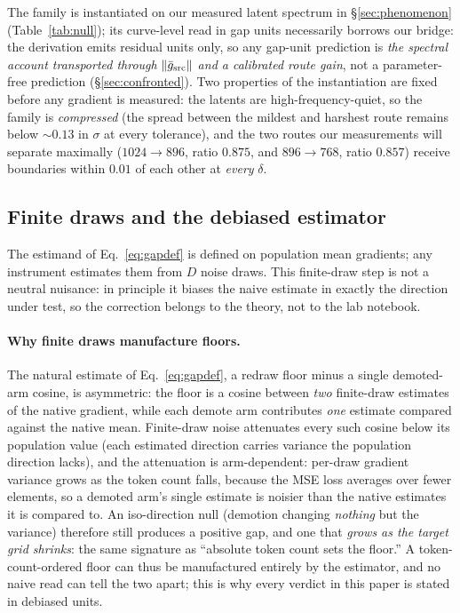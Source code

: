 The family is instantiated on our measured latent spectrum in
\S\ref{sec:phenomenon} (Table~\ref{tab:null}); its curve-level read in
gap units necessarily borrows our bridge: the derivation emits residual
units only, so any gap-unit prediction is \emph{the spectral account
transported through} $\|\bar g_{\mathrm{src}}\|$ \emph{and a calibrated route gain}, not a
parameter-free prediction (\S\ref{sec:confronted}). Two properties of
the instantiation are fixed before any gradient is measured: the latents
are high-frequency-quiet, so the family is \emph{compressed} (the
spread between the mildest and harshest route remains below ${\sim}0.13$
in $\sigma$ at every tolerance), and the two routes our measurements
will separate maximally ($1024{\to}896$, ratio $0.875$, and
$896{\to}768$, ratio $0.857$) receive boundaries within $0.01$ of each
other at \emph{every} $\delta$.

\subsection{Finite draws and the debiased estimator}
\label{sec:debias}

The estimand of Eq.~\ref{eq:gapdef} is defined on population mean
gradients; any instrument estimates them from $D$ noise draws. This
finite-draw step is not a neutral nuisance: in principle it biases the
naive estimate in exactly the direction under test, so the correction
belongs to the theory, not to the lab notebook.

\paragraph{Why finite draws manufacture floors.}
The natural estimate of Eq.~\ref{eq:gapdef}, a redraw floor minus a
single demoted-arm cosine, is asymmetric: the floor is a cosine
between \emph{two} finite-draw estimates of the native gradient, while
each demote arm contributes \emph{one} estimate compared against the
native mean. Finite-draw noise attenuates every such cosine below its
population value (each estimated direction carries variance the
population direction lacks), and the attenuation is arm-dependent:
per-draw gradient variance grows as the token count falls, because the
MSE loss averages over fewer elements, so a demoted arm's single
estimate is noisier than the native estimates it is compared to. An
iso-direction null (demotion changing \emph{nothing} but the
variance) therefore still produces a positive gap, and one that
\emph{grows as the target grid shrinks}: the same signature as
``absolute token count sets the floor.'' A token-count-ordered floor
can thus be manufactured entirely by the estimator, and no naive read
can tell the two apart; this is why every verdict in this paper is
stated in debiased units.

